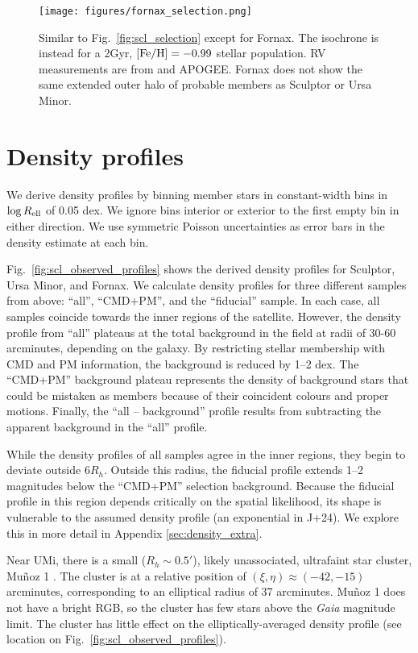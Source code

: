 \begin{figure}
\centering
\texttt{[image: figures/fornax\_selection.png]}
\caption[Fornax sample selection]{Similar to
Fig.~\ref{fig:scl_selection} except for Fornax. The isochrone is instead
for a 2Gyr, \({\rm [Fe/H]}=-0.99\) stellar population. RV measurements
are from \citet{WMO2009} and APOGEE. Fornax does not show the same
extended outer halo of probable members as Sculptor or Ursa
Minor.}\label{fig:fornax_selection}
\end{figure}

\section{Density profiles}\label{sec:data_density_profiles}

We derive density profiles by binning member stars in constant-width
bins in \(\log R_{\rm ell}\) of 0.05 dex. We ignore bins interior or
exterior to the first empty bin in either direction. We use symmetric
Poisson uncertainties as error bars in the density estimate at each bin.

Fig.~\ref{fig:scl_observed_profiles} shows the derived density profiles
for Sculptor, Ursa Minor, and Fornax. We calculate density profiles for
three different samples from above: ``all'', ``CMD+PM'', and the
``fiducial'' sample. In each case, all samples coincide towards the
inner regions of the satellite. However, the density profile from
``all'' plateaus at the total background in the field at radii of 30-60
arcminutes, depending on the galaxy. By restricting stellar membership
with CMD and PM information, the background is reduced by 1--2 dex. The
``CMD+PM'' background plateau represents the density of background stars
that could be mistaken as members because of their coincident colours
and proper motions. Finally, the ``all -- background'' profile results
from subtracting the apparent background in the ``all'' profile.

While the density profiles of all samples agree in the inner regions,
they begin to deviate outside \(6R_h\). Outside this radius, the
fiducial profile extends 1--2 magnitudes below the ``CMD+PM'' selection
background. Because the fiducial profile in this region depends
critically on the spatial likelihood, its shape is vulnerable to the
assumed density profile (an exponential in J+24). We explore this in
more detail in Appendix \ref{sec:density_extra}.

Near UMi, there is a small (\(R_h\sim 0.5'\)), likely unassociated,
ultrafaint star cluster, Muñoz 1 \citep{munoz+2012}. The cluster is at a
relative position of \((\xi, \eta) \approx(-42, -15)\) arcminutes,
corresponding to an elliptical radius of 37 arcminutes. Muñoz 1 does not
have a bright RGB, so the cluster has few stars above the \emph{Gaia}
magnitude limit. The cluster has little effect on the
elliptically-averaged density profile (see location on
Fig.~\ref{fig:scl_observed_profiles}).

